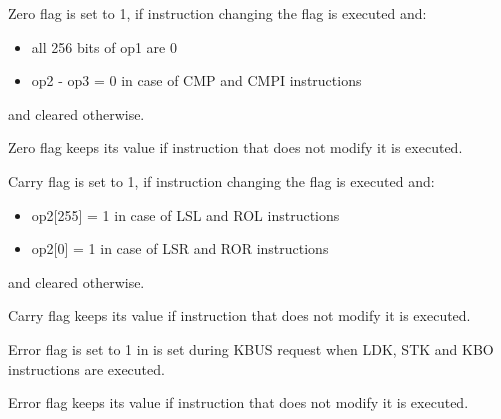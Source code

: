 \documentclass[notconfidential]{tropic_design_spec}
\begin{document}


Zero flag is set to 1, if instruction changing the flag is executed and:
\begin{itemize}
    \item all 256 bits of op1 are 0
    \item op2 - op3 = 0 in case of CMP and CMPI instructions
\end{itemize}
and cleared otherwise.

Zero flag keeps its value if instruction that does not modify it is executed.


Carry flag is set to 1, if instruction changing the flag is executed and:
\begin{itemize}
    \item op2[255] = 1 in case of LSL and ROL instructions
    \item op2[0] = 1 in case of LSR and ROR instructions
\end{itemize}
and cleared otherwise.

Carry flag keeps its value if instruction that does not modify it is executed.


Error flag is set to 1 in  is set during KBUS request
when LDK, STK and KBO instructions are executed.

Error flag keeps its value if instruction that does not modify it is executed.
\end{document}
